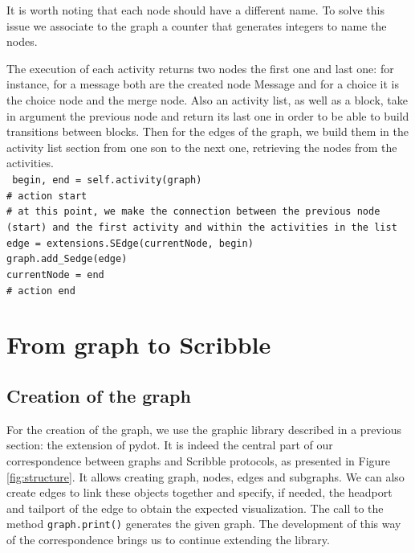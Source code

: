 \documentclass[a4paper,11pt,twoside]{report}
\begin{document}
It is worth noting that each node should have a different name. To solve this issue we associate to the graph a counter that generates integers to name the nodes. 

The execution of each activity returns two nodes the first one and last one: for instance, for a message both are the created node Message and for a choice it is the choice node and the merge node. Also an activity list, as well as a block, take in argument the previous node and return its last one in order to be able to build transitions between blocks. Then for the edges of the graph, we build them in the activity list section from one son to the next one, retrieving the nodes from the activities.\\
\texttt{
begin, end = self.activity(graph)\\
\# action start\\ 
\# at this point, we make the connection between the previous node (start) and the first activity and within the activities in the list\\
 edge = extensions.SEdge(currentNode, begin)\\
 graph.add\_Sedge(edge)\\
 currentNode = end\\
\# action end}

\section{From graph to Scribble}

\subsection{Creation of the graph}
For the creation of the graph, we use the graphic library described in a previous section: the extension of pydot. It is indeed the central part of our correspondence between graphs and Scribble protocols, as presented in Figure \ref{fig:structure}. It allows creating graph, nodes, edges and subgraphs. We can also create edges to link these objects together and specify, if needed, the headport and tailport of the edge to obtain the expected visualization. The call to the method \texttt{graph.print()} generates the given graph. The development of this way of the correspondence brings us to continue extending the library. 
\end{document}

